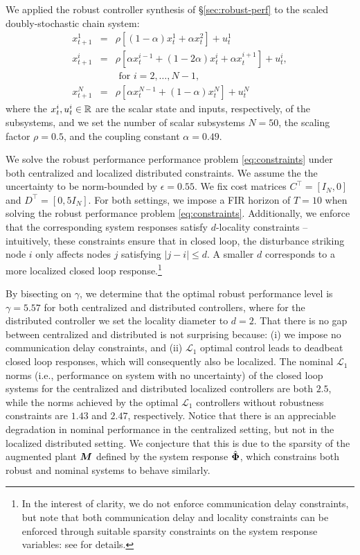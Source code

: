 We applied the robust controller synthesis of \S \ref{sec:robust-perf} to the scaled doubly-stochastic chain system:
\begin{equation}\label{eq:chain}
\begin{array}{rcl}
x^1_{t+1} &=& \rho\left[(1-\alpha)x^1_t + \alpha x^2_t\right] + u^1_t\\
x^i_{t+1} &=& \rho\left[\alpha x^{i-1}_t + (1-2\alpha)x^i_t + \alpha x^{i+1}_t\right] + u^i_t,\\
&& \text{ for $i=2,\dots,N-1$,} \\
 x^N_{t+1} &=& \rho\left[\alpha x^{N-1}_t + (1-\alpha)x^N_t\right] + u^N_t
 \end{array}
\end{equation}
where the $x^i_t, u^i_t \in \mathbb{R}$ are the scalar state and inputs, respectively, of the subsystems, and we set the number of scalar subsystems $N=50$, the scaling factor $\rho = 0.5$, and the coupling constant $\alpha = 0.49$.  

We solve the robust performance performance problem \eqref{eq:constraints} under both centralized and localized distributed constraints. We assume the the uncertainty to be norm-bounded by $\epsilon = 0.55$. We fix cost matrices $C^\top = [I_N, 0]$ and $D^\top = [0, 5I_N]$.  For both settings, we impose a FIR horizon of $T=10$ when solving the robust performance problem \eqref{eq:constraints}.  Additionally, we enforce that the corresponding system responses satisfy $d$-locality constraints -- intuitively, these constraints ensure that in closed loop, the disturbance striking node $i$ only affects nodes $j$ satisfying $|j-i|\leq d$. A smaller $d$ corresponds to a more localized closed loop response.\footnote{In the interest of clarity, we do not enforce communication delay constraints, but note that both communication delay and locality constraints can be enforced through suitable sparsity constraints on the system response variables: see \cite{anderson2019system} for details.}

By bisecting on $\gamma$, we determine that the optimal robust performance level is $\gamma = 5.57$ for both centralized and distributed controllers, where for the distributed controller we set the locality diameter to $d=2$.  That there is no gap between centralized and distributed is not surprising because: (i) we impose no communication delay constraints, and (ii) $\mathcal{L}_1$ optimal control leads to deadbeat closed loop responses, which will consequently also be localized.  The nominal $\mathcal{L}_1$ norms  (i.e., performance on system with no uncertainty) of the closed loop systems for the centralized and distributed localized controllers are both $2.5$, while the norms achieved by the optimal $\mathcal{L}_1$ controllers without robustness constraints are $1.43$ and $2.47$, respectively.  Notice that there is an appreciable degradation in nominal performance in the centralized setting, but not in the localized distributed setting.  We conjecture that this is due to the sparsity of the augmented plant $\boldsymbol{M}$ defined by the system response $\hat{\boldsymbol{\Phi}}$, which constrains both robust and nominal systems to behave similarly.

